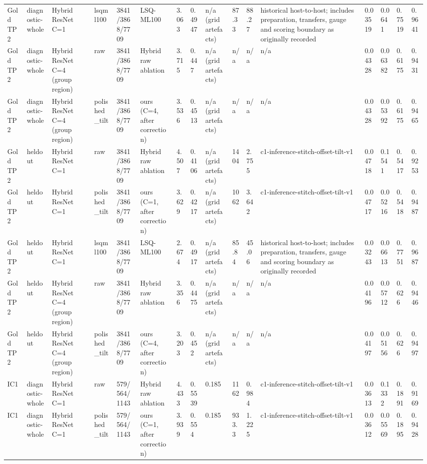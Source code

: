 \begin{tabular}{llllllllllllllll}
Gold TP2 & diagnostic-whole & Hybrid ResNet C=1 & lsqml100 & 3841/3868/7709 & LSQ-ML100 & 3.063 & 0.4947 & n/a (grid artefacts) & 87.33 & 88.27 & historical host-to-host; includes preparation, transfers, gauge and scoring boundary as originally recorded & 0.03519 & 0.0641 & 0.7519 & 0.9641 \\
Gold TP2 & diagnostic-whole & Hybrid ResNet C=4 (group region) & raw & 3841/3868/7709 & Hybrid raw ablation & 3.715 & 0.447 & n/a (grid artefacts) & n/a & n/a & n/a & 0.04328 & 0.06382 & 0.6175 & 0.9431 \\
Gold TP2 & diagnostic-whole & Hybrid ResNet C=4 (group region) & polished\_tilt & 3841/3868/7709 & ours (C=4, after correction) & 3.536 & 0.4513 & n/a (grid artefacts) & n/a & n/a & n/a & 0.04328 & 0.05392 & 0.6175 & 0.9465 \\
Gold TP2 & heldout & Hybrid ResNet C=1 & raw & 3841/3868/7709 & Hybrid raw ablation & 4.507 & 0.4106 & n/a (grid artefacts) & 1404 & 2.755 & c1-inference-stitch-offset-tilt-v1 & 0.04718 & 0.1541 & 0.5417 & 0.9253 \\
Gold TP2 & heldout & Hybrid ResNet C=1 & polished\_tilt & 3841/3868/7709 & ours (C=1, after correction) & 3.629 & 0.4217 & n/a (grid artefacts) & 1062 & 3.642 & c1-inference-stitch-offset-tilt-v1 & 0.04717 & 0.05216 & 0.5418 & 0.9487 \\
Gold TP2 & heldout & Hybrid ResNet C=1 & lsqml100 & 3841/3868/7709 & LSQ-ML100 & 2.674 & 0.4917 & n/a (grid artefacts) & 85.84 & 45.06 & historical host-to-host; includes preparation, transfers, gauge and scoring boundary as originally recorded & 0.03243 & 0.06613 & 0.7751 & 0.9687 \\
Gold TP2 & heldout & Hybrid ResNet C=4 (group region) & raw & 3841/3868/7709 & Hybrid raw ablation & 3.356 & 0.4475 & n/a (grid artefacts) & n/a & n/a & n/a & 0.04196 & 0.05712 & 0.626 & 0.9446 \\
Gold TP2 & heldout & Hybrid ResNet C=4 (group region) & polished\_tilt & 3841/3868/7709 & ours (C=4, after correction) & 3.203 & 0.452 & n/a (grid artefacts) & n/a & n/a & n/a & 0.04197 & 0.05156 & 0.626 & 0.9497 \\
IC1 & diagnostic-whole & Hybrid ResNet C=1 & raw & 579/564/1143 & Hybrid raw ablation & 4.433 & 0.5539 & 0.185 & 1162 & 0.984 & c1-inference-stitch-offset-tilt-v1 & 0.03613 & 0.1332 & 0.1891 & 0.9169 \\
IC1 & diagnostic-whole & Hybrid ResNet C=1 & polished\_tilt & 579/564/1143 & ours (C=1, after correction) & 3.939 & 0.554 & 0.185 & 933.3 & 1.225 & c1-inference-stitch-offset-tilt-v1 & 0.03612 & 0.05569 & 0.1895 & 0.9428 \\

\end{tabular}
